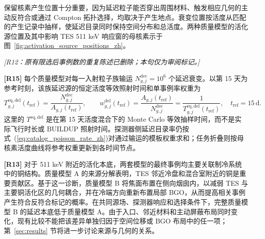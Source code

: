 \documentclass[11pt]{article}
\newcommand{\revdeleted}[1]{\par\noindent\textcolor{revisionblue}{\small\itshape [#1]}\par}
\begin{document}
保留核素产生位置十分重要，因为延迟粒子能否穿出周围材料、触发相应几何的主动反符合或通过 Compton 拓扑选择，均取决于产生地点。衰变位置按活度从匹配的产生记录中抽样，使延迟目录同时保持空间分布和总活度。两种质量模型的活化源位置及其中影响 TES 511 keV 响应窗的母核素示于图~\ref{fig:activation_source_positions_zh}。
\endgroup

\revdeleted{R12：原有限选后事例数的重复陈述已删除；本句仅为审阅标记。}

\begingroup
\color{revisionblue}
\noindent\textbf{[R15]} 每个质量模型对每一入射粒子族输运 $N^{\mathrm{dec}}_{g,j}=10^6$ 个延迟衰变。以第 15 天为参考时刻，该族延迟源的恒定活度等效照射时间和单事例率权重为
\begin{equation}
 T^{\mathrm{eq,del}}_{g,j}(t_{\mathrm{ref}})
 =\frac{N^{\mathrm{dec}}_{g,j}}{A_{g,j}(t_{\mathrm{ref}})},
 \qquad
 w^{\mathrm{del}}_{g,j}(t_{\mathrm{ref}})
 =\frac{A_{g,j}(t_{\mathrm{ref}})}{N^{\mathrm{dec}}_{g,j}}
 =\frac{1}{T^{\mathrm{eq,del}}_{g,j}(t_{\mathrm{ref}})},
 \quad t_{\mathrm{ref}}=15\,\mathrm{d}.
 \label{eq:delayed_equivalent_exposure_zh}
\end{equation}
这里的 $T^{\mathrm{eq,del}}$ 是在第 15 天活度混合下的 Monte Carlo 等效抽样时间，而不是实际飞行时长或 BUILDUP 照射时间。探测器侧延迟目录率仍按式~(\ref{eq:catalog_poisson_rate_zh})对通过输运的模板权重求和；任务折叠则按母核素活度曲线将参考权重更新到各时间节点。
\endgroup

\begingroup
\color{revisionblue}
\noindent\textbf{[R13]} 对于 511 keV 附近的活化本底，两套模型的最终事例均主要关联制冷系统中的铜结构。质量模型 A 的来源分解表明，TES 邻近冷盘和混合室附近的铜是重要贡献区。基于这一诊断，质量模型 B 将焦面布置在侧向烟囱内，以减弱 TES 与主要铜活化区的几何耦合，并在冷端方向重新布置局部 BGO，从而提高相关事例产生符合反符合标记的概率。在共同源场、探测器响应和选择条件下，完整质量模型 B 的延迟本底低于质量模型 A。由于入口、邻近材料和主动屏蔽布局同时变化，现有比较不能把该差异单独归因于空间位移或 BGO 布局中的任一项；第~\ref{sec:results} 节将进一步讨论来源与几何的关系。
\endgroup
\end{document}
